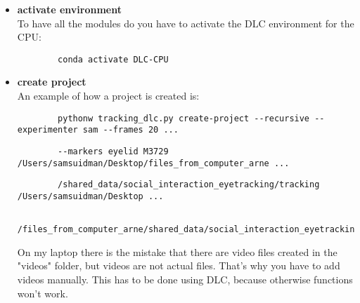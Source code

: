 \documentclass{article}
\begin{document}
\begin{itemize}
    \item \textbf{activate environment} \\
    To have all the modules do you have to activate the DLC environment for the CPU: \\
    \begin{verbatim}
        conda activate DLC-CPU
    \end{verbatim}

    \item \textbf{create project} \\
    An example of how a project is created is:
    \begin{verbatim}
        pythonw tracking_dlc.py create-project --recursive --experimenter sam --frames 20 ...
    \end{verbatim}
    \begin{verbatim}
        --markers eyelid M3729 /Users/samsuidman/Desktop/files_from_computer_arne ...
    \end{verbatim}
    \begin{verbatim}
        /shared_data/social_interaction_eyetracking/tracking /Users/samsuidman/Desktop ...
    \end{verbatim}
    \begin{verbatim}
        /files_from_computer_arne/shared_data/social_interaction_eyetracking/database/M3729
    \end{verbatim}
    
    On my laptop there is the mistake that there are video files created in the "videos" folder, but videos are not actual files. That's why you have to add videos manually. This has to be done using DLC, because otherwise functions won't work.
    

\end{itemize}
\end{document}
